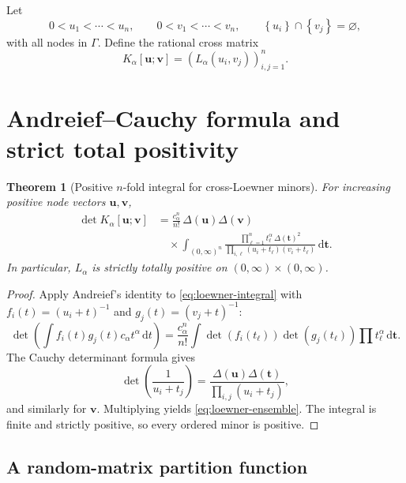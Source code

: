 \documentclass[11pt,oneside]{article}
\newtheorem{theorem}{Theorem}[section]
\theoremstyle{definition}
\theoremstyle{remark}
\newcommand{\dd}{\,\mathrm{d}}
\newcommand{\set}[1]{\left\{#1\right\}}
\newcommand{\vander}{\Delta}
\begin{document}
Let
\[
 0<u_1<\cdots<u_n,
 \qquad
 0<v_1<\cdots<v_n,
 \qquad
 \set{u_i}\cap\set{v_j}=\varnothing,
\]
with all nodes in $\Gamma$.  Define the rational cross matrix
\begin{equation}
 K_\alpha[\bm u;\bm v]
 =(L_\alpha(u_i,v_j))_{i,j=1}^n.
 \label{eq:cross-loewner}
\end{equation}

\section{Andreief--Cauchy formula and strict total positivity}
\label{sec:andreief}

\begin{theorem}[Positive $n$-fold integral for cross-Loewner minors]
\label{thm:loewner-ensemble}
For increasing positive node vectors $\bm u,\bm v$,
\begin{align}
 \det K_\alpha[\bm u;\bm v]
 &=\frac{c_\alpha^n}{n!}\,
 \vander(\bm u)\vander(\bm v)\\
 &\quad\times
 \int_{(0,\infty)^n}
 \frac{\prod_{\ell=1}^n t_\ell^\alpha\,
       \vander(\bm t)^2}
 {\prod_{i,\ell}(u_i+t_\ell)(v_i+t_\ell)}
 \dd\bm t.
 \label{eq:loewner-ensemble}
\end{align}
In particular, $L_\alpha$ is strictly totally positive on $(0,\infty)\times(0,\infty)$.
\end{theorem}

\begin{proof}
Apply Andreief's identity to \eqref{eq:loewner-integral} with
$f_i(t)=(u_i+t)^{-1}$ and $g_j(t)=(v_j+t)^{-1}$:
\[
 \det\left(\int f_i(t)g_j(t)c_\alpha t^\alpha\dd t\right)
 =\frac{c_\alpha^n}{n!}\int
 \det(f_i(t_\ell))\det(g_j(t_\ell))
 \prod t_\ell^\alpha\dd\bm t.
\]
The Cauchy determinant formula gives
\[
 \det\left(\frac1{u_i+t_j}\right)
 =\frac{\vander(\bm u)\vander(\bm t)}
 {\prod_{i,j}(u_i+t_j)},
\]
and similarly for $\bm v$.  Multiplying yields \eqref{eq:loewner-ensemble}.  The integral is finite and strictly positive, so every ordered minor is positive.
\end{proof}

\subsection{A random-matrix partition function}
\end{document}
